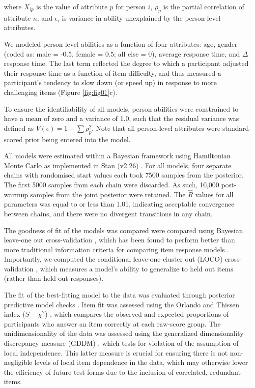 \documentclass[a4paper,man,natbib]{apa6}
\begin{document}
\noindent where $X_{ip}$ is the value of attribute $p$ for person $i$, $\rho_p$ is the partial correlation of attribute $n$, and $\epsilon_i$ is variance in ability unexplained by the person-level attributes.

We modeled person-level abilities as a function of four attributes: age, gender (coded as: male = -0.5, female = 0.5; all else = 0), average response time, and $\Delta$ response time. The last term reflected the degree to which a participant adjusted their response time as a function of item difficulty, and thus measured a participant's tendency to slow down (or speed up) in response to more challenging items (Figure \ref{fig:fig01}c).

To ensure the identifiability of all models, person abilities were constrained to have a mean of zero and a variance of 1.0, such that the residual variance was defined as $V(\epsilon) = 1 - \sum \rho_p^2$. Note that all person-level attributes were standard-scored prior being entered into the model.

All models were estimated within a Bayesian framework using Hamiltonian Monte Carlo as implemented in Stan (v2.26) \citep{carpenter2017stan}. For all models, four separate chains with randomised start values each took 7500 samples from the posterior. The first 5000 samples from each chain were discarded. As such, 10,000 post-warmup samples from the joint posterior were retained. The $\hat{R}$ values for all parameters was equal to or less than 1.01, indicating acceptable convergence between chains, and there were no divergent transitions in any chain. 

The goodness of fit of the models was compared were compared using Bayesian leave-one out cross-validation \citep{vehtari2017practical}, which has been found to perform better than more traditional information criteria for comparing item response models \citep{luo2017performances}. Importantly, we computed the conditional leave-one-cluster out (LOCO) cross- validation \citep{merkle2019bayesian}, which measures a model's ability to generalize to held out items (rather than held out responses). 

The fit of the best-fitting model to the data was evaluated through posterior predictive model checks \citep{gelman1996posterior, levy2017bayesian}. Item fit was assessed using the Orlando and Thissen index ($S-\chi^2$) \citep{toribio2011discrepancy}, which compares the observed and expected proportions of participants who answer an item correctly at each raw-score group. The unidimensionality of the data was assessed using the generalized dimensionality discrepancy measure (GDDM) \citep{levy2011generalized}, which tests for violation of the assumption of local independence. This latter measure is crucial for ensuring there is not non-negligible levels of local item dependence in the data, which may otherwise lower the efficiency of future test forms due to the inclusion of correlated, redundant items.    
\end{document}
